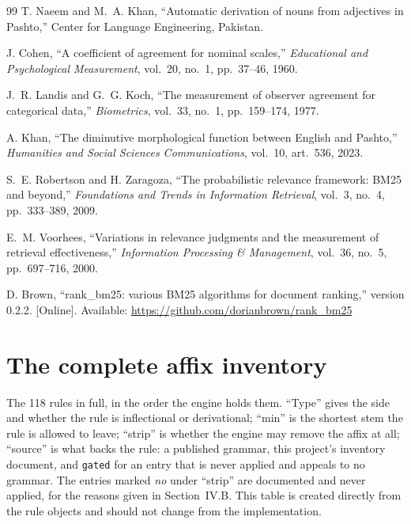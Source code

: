 \documentclass[conference]{IEEEtran}
\begin{document}
\begin{thebibliography}{99}
T. Naeem and M.~A. Khan, ``Automatic derivation of nouns from adjectives in
Pashto,'' Center for Language Engineering, Pakistan.

J. Cohen, ``A coefficient of agreement for nominal scales,''
\emph{Educational and Psychological Measurement}, vol.~20, no.~1,
pp.~37--46, 1960.

J.~R. Landis and G.~G. Koch, ``The measurement of observer agreement for
categorical data,'' \emph{Biometrics}, vol.~33, no.~1, pp.~159--174, 1977.

A. Khan, ``The diminutive morphological function between English and
Pashto,'' \emph{Humanities and Social Sciences Communications}, vol.~10,
art.~536, 2023.

S.~E. Robertson and H. Zaragoza, ``The probabilistic relevance framework:
BM25 and beyond,'' \emph{Foundations and Trends in Information Retrieval},
vol.~3, no.~4, pp.~333--389, 2009.

E.~M. Voorhees, ``Variations in relevance judgments and the measurement of
retrieval effectiveness,'' \emph{Information Processing \& Management},
vol.~36, no.~5, pp.~697--716, 2000.

D. Brown, ``rank\_bm25: various BM25 algorithms for document ranking,''
version 0.2.2. [Online]. Available:
\url{https://github.com/dorianbrown/rank_bm25}

\end{thebibliography}

\onecolumn
\appendix
\section{The complete affix inventory}

The 118 rules in full, in the order the engine holds them. ``Type'' gives the
side and whether the rule is inflectional or derivational; ``min'' is the
shortest stem the rule is allowed to leave; ``strip'' is whether the engine may
remove the affix at all; ``source'' is what backs the rule: a published grammar, this project's
inventory document, and \texttt{gated} for an entry that is never applied and
appeals to no grammar. The entries marked \emph{no} under
``strip'' are documented and never applied, for the reasons given in
Section~IV.B. This table is created
directly from the rule objects and should not change from the implementation.

\footnotesize

\normalsize


\end{document}

